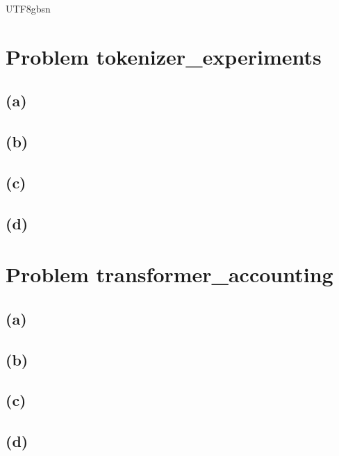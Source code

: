\documentclass{article}
\begin{document}
\begin{CJK}{UTF8}{gbsn}
\section*{Problem tokenizer\_experiments}

\subsection*{(a)}

\subsection*{(b)}

\subsection*{(c)}

\subsection*{(d)}

\section*{Problem transformer\_accounting}

\subsection*{(a)}

\subsection*{(b)}

\subsection*{(c)}

\subsection*{(d)}


\end{CJK}
\end{document}
